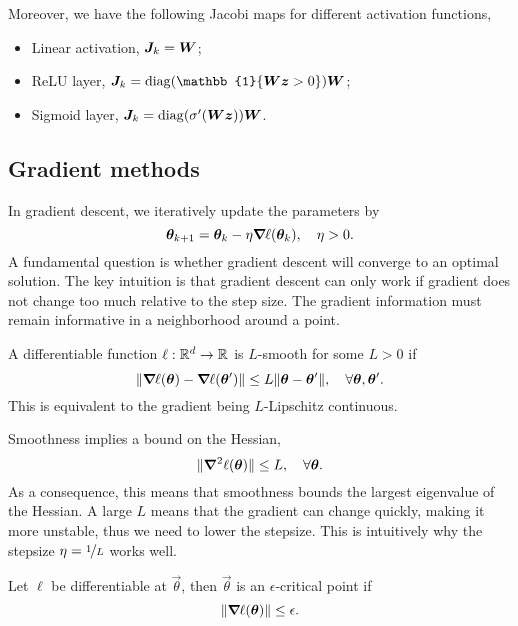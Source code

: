 Moreover, we have the following Jacobi maps for different activation functions,
\begin{itemize}
    \item Linear activation, $\bm{J}_k = \bm{W}$;
    \item ReLU layer, $\mat{J}_k = \mathrm{diag}(\mathbb{1}\{ \mat{W}\vec{z} > 0 \}) \mat{W}$;
    \item Sigmoid layer, $\bm{J}_k = \mathrm{diag}(\sigma'(\bm{W} \bm{z})) \bm{W}$.
\end{itemize}

\subsection{Gradient methods}

In gradient descent, we iteratively update the parameters by \[
    \bm{\theta}_{k+1} = \bm{\theta}_k - \eta \bm{\nabla}_{\! } \ell(\bm{\theta}_k), \quad \eta > 0.
\]
A fundamental question is whether gradient descent will converge to an optimal solution. The key
intuition is that gradient descent can only work if gradient does not change too much relative to
the step size. The gradient information must remain informative in a neighborhood around a point.

\begin{definition}[Smoothness]
    A differentiable function $\ell: \mathbb{R}^d \to \mathbb{R}$ is $L$-smooth for some $L > 0$ if \[
        \| \bm{\nabla}_{\! } \ell(\bm{\theta}) - \bm{\nabla}_{\! } \ell(\bm{\theta}') \| \leq L \| \bm{\theta} - \bm{\theta}' \|, \quad \forall \bm{\theta}, \bm{\theta}'.
    \]
    This is equivalent to the gradient being $L$-Lipschitz continuous.
\end{definition}

Smoothness implies a bound on the Hessian, \[
    \| \bm{\nabla}^2_{\! } \ell(\bm{\theta}) \| \leq L, \quad \forall \bm{\theta}.
\]
As a consequence, this means that smoothness bounds the largest eigenvalue of the Hessian. A large
$L$ means that the gradient can change quickly, making it more unstable, thus we need to lower the
stepsize. This is intuitively why the stepsize $\eta = \nicefrac{1}{L}$ works well.

\begin{definition}
    Let $\ell$ be differentiable at $\vec{\theta}$, then $\vec{\theta}$ is an $\epsilon$-critical point if \[
        \| \bm{\nabla}_{\! } \ell(\bm{\theta}) \| \leq \epsilon.
    \]
\end{definition}

